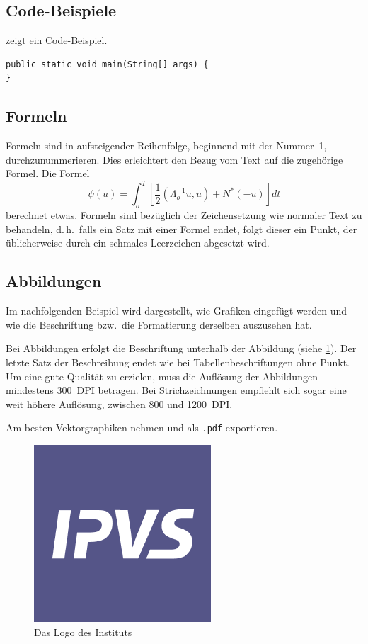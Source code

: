 \documentclass[runningheads,a4paper]{llncs}[2015/06/24]
\begin{document}
\subsection{Code-Beispiele}

 zeigt ein Code-Beispiel.

\begin{lstlisting}[float,caption=A floating example,label=lst:example]
public static void main(String[] args) {
}
\end{lstlisting}

\subsection{Formeln}
Formeln sind in aufsteigender Reihenfolge, beginnend mit der Nummer~1, durchzunummerieren.
Dies erleichtert den Bezug vom Text auf die zugehörige Formel.
Die Formel
%
\begin{equation}
  \psi (u) = \int_{o}^{T} \left[\frac{1}{2}
  \left(\Lambda_{o}^{-1} u,u\right) + N^{\ast} (-u)\right] dt
\end{equation}
%
berechnet etwas.
Formeln sind bezüglich der Zeichensetzung wie normaler Text zu behandeln, d.\,h.\ falls ein Satz mit einer Formel endet, folgt dieser ein Punkt, der üblicherweise durch ein schmales Leerzeichen abgesetzt wird.

\subsection{Abbildungen}
Im nachfolgenden Beispiel wird dargestellt, wie Grafiken eingefügt werden und wie die Beschriftung bzw.\ die Formatierung derselben auszusehen hat.

Bei Abbildungen erfolgt die Beschriftung unterhalb der Abbildung (siehe \cref{fig:logo}).
Der letzte Satz der Beschreibung endet wie bei Tabellenbeschriftungen ohne Punkt.
Um eine gute Qualität zu erzielen, muss die Auflösung der Abbildungen mindestens 300~DPI betragen.
Bei Strichzeichnungen empfiehlt sich sogar eine weit höhere Auflösung, zwischen 800 und
1200~DPI.

Am besten Vektorgraphiken nehmen und als \texttt{.pdf} exportieren.

\begin{figure}
  \begin{center}
    \includegraphics[width=.5\textwidth]{ipvslogo.png}
    \caption{Das Logo des Instituts}
    \label{fig:logo}
   \end{center}
\end{figure}
\end{document}
